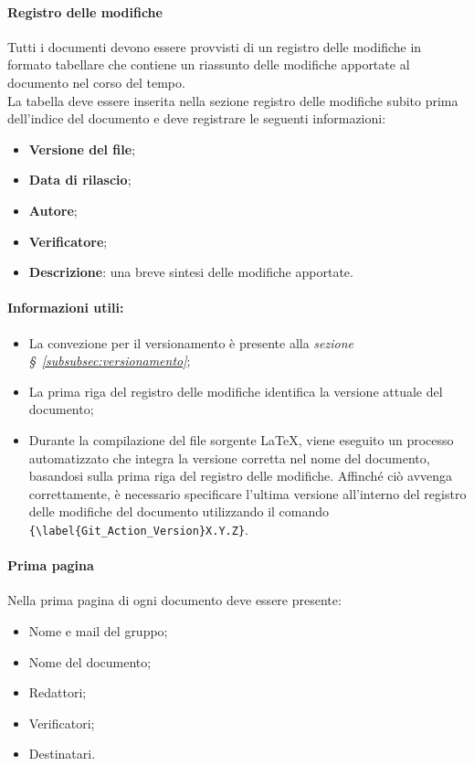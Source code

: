 \paragraph{Registro delle modifiche}
\label{sec:RegistroModifiche}
Tutti i documenti devono essere provvisti di un registro delle modifiche in formato tabellare che contiene un riassunto
delle modifiche apportate al documento nel corso del tempo. \\
La tabella deve essere inserita nella sezione registro delle modifiche subito prima dell’indice del documento e deve registrare le seguenti informazioni:
\begin{itemize}
    \item \textbf{Versione del file};
    \item \textbf{Data di rilascio};
    \item \textbf{Autore};
    \item \textbf{Verificatore};
    \item \textbf{Descrizione}: una breve sintesi delle modifiche apportate.
\end{itemize}

\hypertarget{par:infoUtiliRegistroMod}{\paragraph*{Informazioni utili:}}
\begin{itemize}
    \item La convezione per il versionamento è presente alla \textit{sezione \S~\ref{subsubsec:versionamento}};
    \item La prima riga del registro delle modifiche identifica la versione attuale del documento;
    \item Durante la compilazione del file sorgente \LaTeX, viene eseguito un processo automatizzato che integra la versione corretta nel nome del documento, basandosi sulla prima riga del registro delle modifiche. Affinché ciò avvenga correttamente, è necessario specificare l'ultima versione all'interno del registro delle modifiche del documento utilizzando il comando \verb|{\label{Git_Action_Version}X.Y.Z}|.
\end{itemize}

\paragraph{Prima pagina}
Nella prima pagina di ogni documento deve essere presente:
\begin{itemize}
    \item Nome e mail del gruppo;
    \item Nome del documento;
    \item Redattori;
    \item Verificatori;
    \item Destinatari.
\end{itemize}

